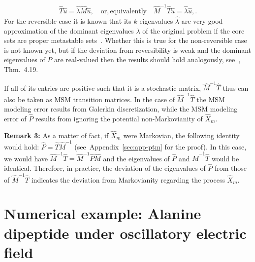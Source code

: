 \documentclass[journal=jctcce,manuscript=article]{achemso}
\begin{document}
\begin{align}
  \label{eq:msm-gen-ev}
\hat{T}\hat{u}=\hat{\lambda}\hat{M}\hat{u},\quad\mathrm{or, equivalently}\quad \hat{M}^{-1}\hat{T}\hat{u}=\hat{\lambda}\hat{u},.  
\end{align}
For the reversible case it is known that its $k$ eigenvalues $\hat{\lambda}$ are very good approximation of the dominant eigenvalues $\lambda$ of the original problem if the core sets are proper metastable sets~\cite{Eigenvalues}. Whether this is true for the non-reversible case is not known yet, but if the deviation from reversibility is weak and the dominant eigenvalues of $P$ are real-valued then the results should hold analogously, see~\cite{A19-31}, Thm.~4.19. 

If all of its entries are positive such that it is a stochastic matrix, $\hat{M}^{-1}\hat{T}$ thus can also be taken as MSM transition matrices. In the case of $\hat{M}^{-1}\hat{T}$ the MSM modeling error results from Galerkin discretization, while the MSM modeling error of $\hat{P}$ results from ignoring the potential non-Markovianity of $\hat{X}_m$.

\textbf{Remark 3:} As a matter of fact, if $\hat X_m$ were Markovian, the following identity would hold: $\hat P = \hat T \hat M^{-1}$ (see~Appendix~\ref{sec:app-ptm} for the proof). In this case, we would have $\hat{M}^{-1}\hat{T}=\hat{M}^{-1}\hat{P}\hat{M}$ and the eigenvalues of $\hat{P}$ and $\hat{M}^{-1}\hat{T}$ would be identical.
Therefore, in practice, the deviation of the eigenvalues of $\hat P$ from those of $\hat{M}^{-1}\hat{T}$ indicates the deviation from Markovianity regarding the process $\hat{X}_m$.





\section{Numerical example:
  Alanine dipeptide under oscillatory electric field}
\label{sec:alanine}
\end{document}
